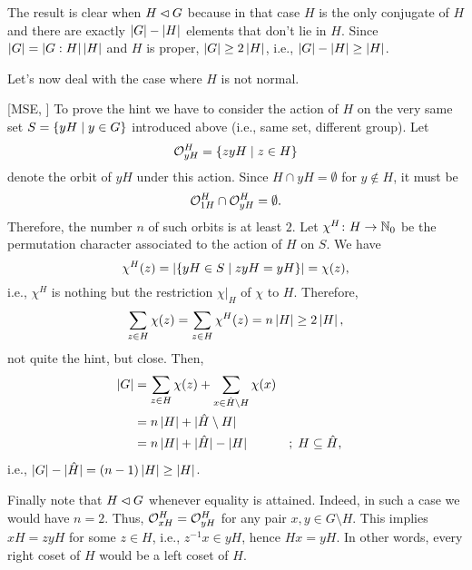 \begin{solution}
    The result is clear when $H\lhd G$ because in that case $H$ is the only conjugate of $H$ and there are exactly $\left\vert{G}\right\vert-\left\vert{H}\right\vert$ elements that don't lie in $H$. Since $\left\vert{G}\right\vert=\left\vert{G:H}\right\vert\left\vert{H}\right\vert$ and $H$ is proper, $\left\vert{G}\right\vert\ge2\left\vert{H}\right\vert$, i.e., $\left\vert{G}\right\vert-\left\vert{H}\right\vert\ge \left\vert{H}\right\vert$.

    Let's now deal with the case where $H$ is not normal.
    
    [MSE, \citeyear{1522816}] To prove the hint we have to consider the action of $H$ on the very same set $S=\{yH\mid y\in G\}$ introduced above (i.e., same set, different group). Let
    $$
        {\cal O}^H_{yH} = \{zyH\mid z\in H\}
    $$
    denote the orbit of $yH$ under this action. Since $H\cap yH=\emptyset$ for $y\notin H$, it must be
    $$
        {\cal O}^H_{1H}\cap{\cal O}^H_{yH}=\emptyset.
    $$
    Therefore, the number $n$ of such orbits is at least $2$. Let $\chi^H\colon H\to\mathbb{N}_0$ be the permutation character associated to the action of $H$ on $S$. We have
    $$
        \chi^H(z) = |\{yH\in S\mid zyH=yH\}| = \chi(z),
    $$
    i.e., $\chi^H$ is nothing but the restriction $\chi|_H$ of $\chi$ to $H$. Therefore,
    $$
        \sum_{z\in H}\chi(z) =\sum_{z\in H}\chi^H(z) = n\left\vert{H}\right\vert \ge 2\left\vert{H}\right\vert,
    $$
    not quite the hint, but close. Then,
    \begin{align*}
        \left\vert{G}\right\vert &=\sum_{z\in H}\chi(z) + \sum_{x\in\hat H\setminus H}\chi(x)\\
            &= n\left\vert{H}\right\vert + |\hat H\setminus H|\\
            &=n\left\vert{H}\right\vert + |\hat H| - \left\vert{H}\right\vert    &&;\; H\subseteq\hat H,
    \end{align*}
    i.e., $\left\vert{G}\right\vert- |\hat H| = (n-1)\left\vert{H}\right\vert\ge \left\vert{H}\right\vert$.
    
    Finally note that $H\lhd G$ whenever equality is attained. Indeed, in such a case we would have $n=2$. Thus,  ${\cal O}^H_{xH}={\cal O}^H_{yH}$ for any pair $x,y\in G\setminus H$. This implies $xH=zyH$ for some $z\in H$, i.e., $z^{-1}x\in yH$, hence $Hx=yH$. In other words, every right coset of $H$ would be a left coset of $H$.
\end{solution}

